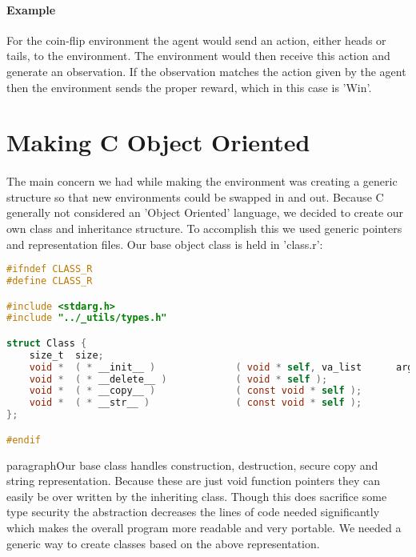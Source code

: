 \documentclass[fancychapters]{report}   	%
\begin{document}
\paragraph{Example}For the coin-flip environment the agent would send an action, either heads or tails, to the environment.  The environment would then receive this action and generate an observation.  If the observation matches the action given by the agent then the environment sends the proper reward, which in this case is 'Win'. 
\section{Making C Object Oriented}
\paragraph{}The main concern we had while making the environment was creating a generic structure so that new environments could be swapped in and out. Because C generally not considered an 'Object Oriented' language, we decided to create our own class and inheritance structure.  To accomplish this we used generic pointers and representation files. Our base object class is held in 'class.r':
\begin{lstlisting}[language=C,caption={class.r}]
#ifndef CLASS_R
#define CLASS_R

#include <stdarg.h>
#include "../_utils/types.h"

struct Class {
    size_t  size;
    void *  ( * __init__ )              ( void * self, va_list      args );
    void *  ( * __delete__ )            ( void * self );
    void *  ( * __copy__ )              ( const void * self );
    void *  ( * __str__ )               ( const void * self );
};

#endif
\end{lstlisting}    
paragraph{}Our base class handles construction, destruction, secure copy and string representation. Because these are just void function pointers they can easily be over written by the inheriting class. Though this does sacrifice some type security the abstraction decreases the lines of code needed significantly which makes the overall program more readable and very portable. We needed a generic way to create classes based on the above representation.
\end{document}
